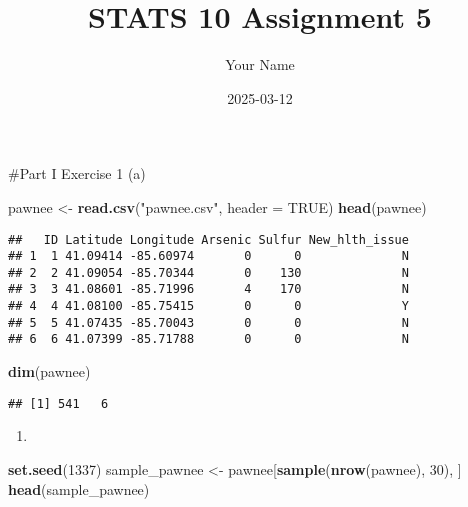 \documentclass[
]{article}
\title{STATS 10 Assignment 5}
\author{Your Name}
\date{2025-03-12}
\newenvironment{Shaded}{\begin{snugshade}}{\end{snugshade}}
\newcommand{\AttributeTok}[1]{\textcolor[rgb]{0.13,0.29,0.53}{#1}}
\newcommand{\ConstantTok}[1]{\textcolor[rgb]{0.56,0.35,0.01}{#1}}
\newcommand{\DecValTok}[1]{\textcolor[rgb]{0.00,0.00,0.81}{#1}}
\newcommand{\FunctionTok}[1]{\textcolor[rgb]{0.13,0.29,0.53}{\textbf{#1}}}
\newcommand{\NormalTok}[1]{#1}
\newcommand{\OtherTok}[1]{\textcolor[rgb]{0.56,0.35,0.01}{#1}}
\newcommand{\SpecialCharTok}[1]{\textcolor[rgb]{0.81,0.36,0.00}{\textbf{#1}}}
\newcommand{\StringTok}[1]{\textcolor[rgb]{0.31,0.60,0.02}{#1}}
\providecommand{\tightlist}{%
  \setlength{\itemsep}{0pt}\setlength{\parskip}{0pt}}
\begin{document}
\maketitle

\begin{Shaded}
\end{Shaded}

\#Part I Exercise 1 (a)

\begin{Shaded}
\begin{Highlighting}[]
\NormalTok{pawnee }\OtherTok{\textless{}{-}} \FunctionTok{read.csv}\NormalTok{(}\StringTok{"pawnee.csv"}\NormalTok{, }\AttributeTok{header =} \ConstantTok{TRUE}\NormalTok{)}
\FunctionTok{head}\NormalTok{(pawnee)}
\end{Highlighting}
\end{Shaded}

\begin{verbatim}
##   ID Latitude Longitude Arsenic Sulfur New_hlth_issue
## 1  1 41.09414 -85.60974       0      0              N
## 2  2 41.09054 -85.70344       0    130              N
## 3  3 41.08601 -85.71996       4    170              N
## 4  4 41.08100 -85.75415       0      0              Y
## 5  5 41.07435 -85.70043       0      0              N
## 6  6 41.07399 -85.71788       0      0              N
\end{verbatim}

\begin{Shaded}
\begin{Highlighting}[]
\FunctionTok{dim}\NormalTok{(pawnee)}
\end{Highlighting}
\end{Shaded}

\begin{verbatim}
## [1] 541   6
\end{verbatim}

\begin{enumerate}
\def\labelenumi{(\alph{enumi})}
\setcounter{enumi}{1}
\tightlist
\item
\end{enumerate}

\begin{Shaded}
\begin{Highlighting}[]
\FunctionTok{set.seed}\NormalTok{(}\DecValTok{1337}\NormalTok{)}
\NormalTok{sample\_pawnee }\OtherTok{\textless{}{-}}\NormalTok{ pawnee[}\FunctionTok{sample}\NormalTok{(}\FunctionTok{nrow}\NormalTok{(pawnee), }\DecValTok{30}\NormalTok{), ]}
\FunctionTok{head}\NormalTok{(sample\_pawnee)}
\end{Highlighting}
\end{Shaded}
\end{document}
